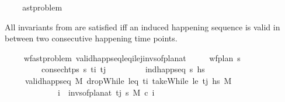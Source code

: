 \begin{isabellebody}
\isanewline
%
\endisadelimproof
\isanewline
{}\isamarkupfalse%
\ %
\ \isanewline
\isanewline
{}\isamarkupfalse%
\ ast{\isacharunderscore}{\kern0pt}problem\isanewline
{}%
\begin{isamarkuptext}%
All invariants from  are satisfied iff an induced happening 
  sequence is valid in between two consecutive happening time points.%
\end{isamarkuptext}\isamarkuptrue%
\ \ \isamarkupfalse%
\ {\isacharparenleft}{\kern0pt}\ wf{\isacharunderscore}{\kern0pt}ast{\isacharunderscore}{\kern0pt}problem{\isacharparenright}{\kern0pt}\ valid{\isacharunderscore}{\kern0pt}happ{\isacharunderscore}{\kern0pt}seq{\isacharunderscore}{\kern0pt}leq\isactrlsub i{\isacharunderscore}{\kern0pt}le\isactrlsub j{\isacharunderscore}{\kern0pt}invs{\isacharunderscore}{\kern0pt}of{\isacharunderscore}{\kern0pt}plan{\isacharunderscore}{\kern0pt}at{\isacharcolon}{\kern0pt}\isanewline
\ \ \ \ \ {\isachardoublequoteopen}wf{\isacharunderscore}{\kern0pt}plan\ {\isasympi}s{\isachardoublequoteclose}\isanewline
\ \ \ \ \ \ \ \ \ {\isachardoublequoteopen}consec{\isacharunderscore}{\kern0pt}htps\ {\isasympi}s\ t\isactrlsub i\ t\isactrlsub j{\isachardoublequoteclose}\isanewline
\ \ \ \ \ \ \ \ \ {\isachardoublequoteopen}ind{\isacharunderscore}{\kern0pt}happ{\isacharunderscore}{\kern0pt}seq\ {\isasympi}s\ hs{\isachardoublequoteclose}\isanewline
\ \ \ \ \ {\isachardoublequoteopen}valid{\isacharunderscore}{\kern0pt}happ{\isacharunderscore}{\kern0pt}seq\ M\ {\isacharparenleft}{\kern0pt}dropWhile\ {\isacharparenleft}{\kern0pt}leq\ t\isactrlsub i{\isacharparenright}{\kern0pt}\ {\isacharparenleft}{\kern0pt}takeWhile\ {\isacharparenleft}{\kern0pt}le\ t\isactrlsub j{\isacharparenright}{\kern0pt}\ hs{\isacharparenright}{\kern0pt}{\isacharparenright}{\kern0pt}\ M\isanewline
\ \ \ \ \ \ \ \ \ \ \ \ {\isasymlongleftrightarrow}\ {\isacharparenleft}{\kern0pt}{\isasymforall}i\ {\isasymin}\ invs{\isacharunderscore}{\kern0pt}of{\isacharunderscore}{\kern0pt}plan{\isacharunderscore}{\kern0pt}at\ t\isactrlsub j\ {\isasympi}s{\isachardot}{\kern0pt}\ M\ \isactrlsup c{\isasymTTurnstile}\isactrlsub {\isacharequal}{\kern0pt}\ i{\isacharparenright}{\kern0pt}{\isachardoublequoteclose}\isanewline

\end{isabellebody}
